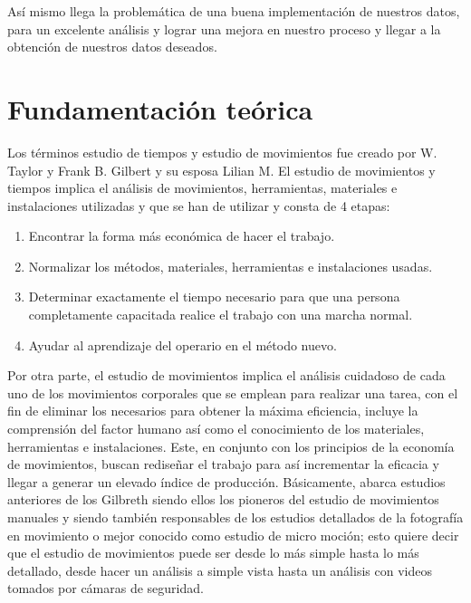     Así mismo llega la problemática de una buena implementación de nuestros datos, para un excelente análisis y lograr una mejora en nuestro proceso y llegar a la obtención de nuestros datos deseados.
    
    \section{Fundamentación teórica}
    
    
    
    Los términos estudio de tiempos y estudio de movimientos fue creado por W. Taylor y Frank B. Gilbert y su esposa Lilian M. El estudio de movimientos y tiempos implica el análisis de movimientos, herramientas, materiales e instalaciones utilizadas y que se han de utilizar y consta de 4 etapas:
    \begin{enumerate}
        \item Encontrar la forma más económica de hacer el trabajo.
        \item Normalizar los métodos, materiales, herramientas e instalaciones usadas.
        \item Determinar exactamente el tiempo necesario para que una persona completamente capacitada realice el trabajo con una marcha normal.
    \item Ayudar al aprendizaje del operario en el método nuevo.
    \end{enumerate}
    
    
    Por otra parte, el estudio de movimientos implica el análisis cuidadoso de cada uno de los movimientos corporales que se emplean para realizar una tarea, con el fin de eliminar los necesarios para obtener la máxima eficiencia, incluye la comprensión del factor humano así como el conocimiento de los materiales, herramientas e instalaciones.  
    Este, en conjunto con los principios de la economía de movimientos, buscan rediseñar el trabajo para así incrementar la eficacia y llegar a generar un elevado índice de producción. 
    Básicamente, abarca estudios anteriores de los Gilbreth siendo ellos los pioneros del estudio de movimientos manuales y siendo también responsables de los estudios detallados de la fotografía en movimiento o mejor conocido como estudio de micro moción; esto quiere decir que el estudio de movimientos puede ser desde lo más simple hasta lo más detallado, desde hacer un análisis a simple vista hasta un análisis con videos tomados por cámaras de seguridad. 
    \cite{niebel1980ingenieria}
    
